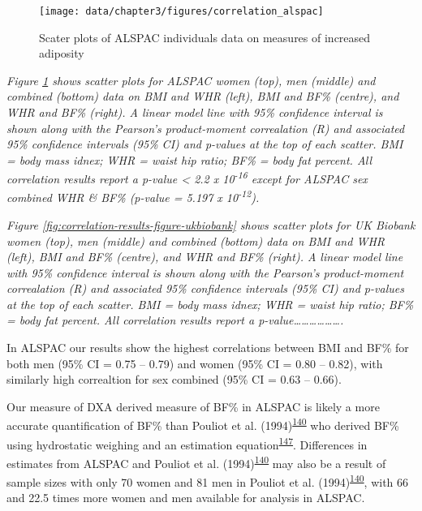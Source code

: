 \documentclass[11pt,twoside]{bristolthesis}
\begin{document}
\noindent
\begin{figure}
\texttt{[image: data/chapter3/figures/correlation\_alspac]} \caption{Scater plots of ALSPAC individuals data on measures of increased adiposity}\label{fig:correlation-results-figure-alspac}
\end{figure}
\emph{Figure \ref{fig:correlation-results-figure-alspac} shows scatter plots for ALSPAC women (top), men (middle) and combined (bottom) data on BMI and WHR (left), BMI and BF\% (centre), and WHR and BF\% (right). A linear model line with 95\% confidence interval is shown along with the Pearson's product-moment correalation (R) and associated 95\% confidence intervals (95\% CI) and p-values at the top of each scatter. BMI = body mass idnex; WHR = waist hip ratio; BF\% = body fat percent. All correlation results report a p-value \textless{} 2.2 x 10\textsuperscript{-16} except for ALSPAC sex combined WHR \& BF\% (p-value = 5.197 x 10\textsuperscript{-12}).}
\noindent
\bigskip
\bigskip

\emph{Figure \ref{fig:correlation-results-figure-ukbiobank} shows scatter plots for UK Biobank women (top), men (middle) and combined (bottom) data on BMI and WHR (left), BMI and BF\% (centre), and WHR and BF\% (right). A linear model line with 95\% confidence interval is shown along with the Pearson's product-moment correalation (R) and associated 95\% confidence intervals (95\% CI) and p-values at the top of each scatter. BMI = body mass idnex; WHR = waist hip ratio; BF\% = body fat percent. All correlation results report a p-value\ldots{}\ldots{}\ldots{}\ldots{}\ldots{}\ldots{}.}
\noindent
\bigskip
\bigskip

In ALSPAC our results show the highest correlations between BMI and BF\% for both men (95\% CI = 0.75 -- 0.79) and women (95\% CI = 0.80 -- 0.82), with similarly high correaltion for sex combined (95\% CI = 0.63 -- 0.66).

Our measure of DXA derived measure of BF\% in ALSPAC is likely a more accurate quantification of BF\% than Pouliot et al. (1994)\textsuperscript{\protect\hyperlink{ref-Pouliot1994}{140}} who derived BF\% using hydrostatic weighing and an estimation equation\textsuperscript{\protect\hyperlink{ref-SIRI1956}{147}}. Differences in estimates from ALSPAC and Pouliot et al. (1994)\textsuperscript{\protect\hyperlink{ref-Pouliot1994}{140}} may also be a result of sample sizes with only 70 women and 81 men in Pouliot et al. (1994)\textsuperscript{\protect\hyperlink{ref-Pouliot1994}{140}}, with 66 and 22.5 times more women and men available for analysis in ALSPAC.
\end{document}
